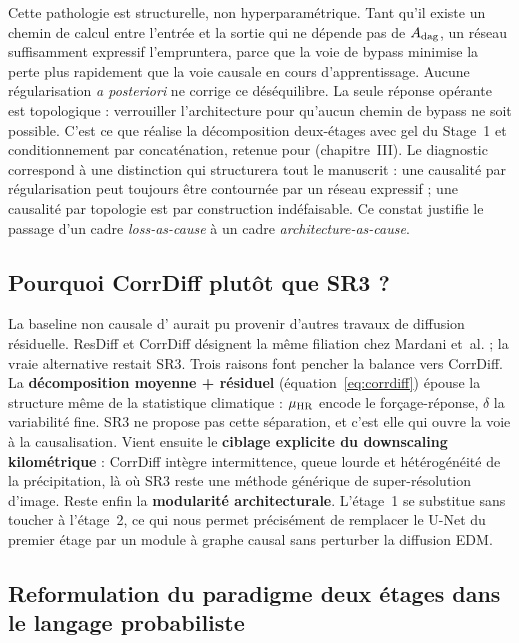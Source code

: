 Cette pathologie est structurelle, non hyperparamétrique. Tant qu'il existe un chemin de calcul entre l'entrée \LR{} et la sortie qui ne dépende pas de $A_{\mathrm{dag}}$, un réseau suffisamment expressif l'empruntera, parce que la voie de bypass minimise la perte plus rapidement que la voie causale en cours d'apprentissage. Aucune régularisation \emph{a posteriori} ne corrige ce déséquilibre. La seule réponse opérante est topologique : verrouiller l'architecture pour qu'aucun chemin de bypass ne soit possible. C'est ce que réalise la décomposition deux-étages avec gel du Stage~1 et conditionnement par concaténation, retenue pour \Oracle{} (chapitre~III). Le diagnostic correspond à une distinction qui structurera tout le manuscrit : une causalité par régularisation peut toujours être contournée par un réseau expressif ; une causalité par topologie est par construction indéfaisable. Ce constat justifie le passage d'un cadre \emph{loss-as-cause} à un cadre \emph{architecture-as-cause}.

\subsection{Pourquoi CorrDiff plutôt que SR3 ?}
\label{ssec:soa-corrdiff-choix}

La baseline non causale d'\Oracle{} aurait pu provenir d'autres travaux de diffusion résiduelle. ResDiff et CorrDiff désignent la même filiation chez Mardani et~al. ; la vraie alternative restait SR3. Trois raisons font pencher la balance vers CorrDiff. La \textbf{décomposition moyenne + résiduel} (équation~\ref{eq:corrdiff}) épouse la structure même de la statistique climatique : $\mu_{\text{HR}}$ encode le forçage-réponse, $\delta$ la variabilité fine. SR3 ne propose pas cette séparation, et c'est elle qui ouvre la voie à la causalisation. Vient ensuite le \textbf{ciblage explicite du downscaling kilométrique} : CorrDiff intègre intermittence, queue lourde et hétérogénéité de la précipitation, là où SR3 reste une méthode générique de super-résolution d'image. Reste enfin la \textbf{modularité architecturale}. L'étage~1 se substitue sans toucher à l'étage~2, ce qui nous permet précisément de remplacer le U-Net du premier étage par un module à graphe causal sans perturber la diffusion EDM.

\subsection{Reformulation du paradigme deux étages dans le langage probabiliste}
\label{ssec:soa-corrdiff-reform}

